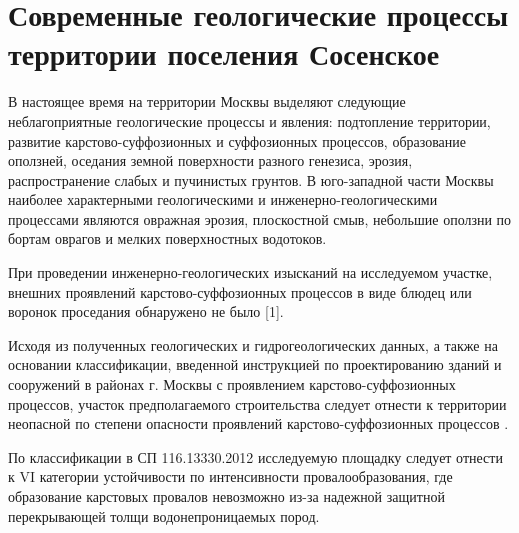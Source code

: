 \chapter*{Современные геологические процессы территории поселения Сосенское}

В настоящее время на территории Москвы выделяют следующие неблагоприятные геологические процессы и явления: 
подтопление территории, развитие карстово-суффозионных и суффозионных процессов, образование оползней, 
оседания земной поверхности разного генезиса, эрозия, распространение слабых и пучинистых грунтов. 
В юго-западной части Москвы наиболее характерными геологическими и инженерно-геологическими процессами 
являются овражная эрозия, плоскостной смыв, небольшие оползни по бортам оврагов и мелких поверхностных водотоков.

При проведении инженерно-геологических изысканий на исследуемом участке, внешних проявлений карстово-суффозионных 
процессов в виде блюдец или воронок проседания обнаружено не было [1].

Исходя из полученных геологических и гидрогеологических данных, а также на основании классификации, 
введенной инструкцией по проектированию зданий и сооружений в районах г. Москвы с проявлением 
карстово-суффозионных процессов, участок предполагаемого строительства следует отнести к территории 
неопасной по степени опасности проявлений карстово-суффозионных процессов .

По классификации в СП 116.13330.2012 исследуемую площадку следует отнести к VI категории устойчивости 
по интенсивности провалообразования, где образование карстовых провалов невозможно 
из-за надежной защитной перекрывающей толщи водонепроницаемых пород.